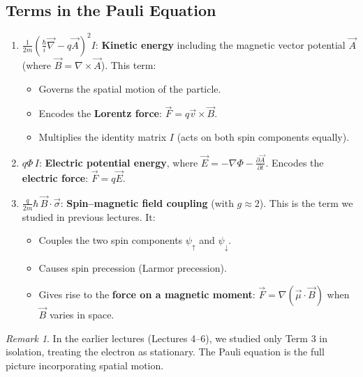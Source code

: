 \documentclass[11pt,a4paper]{article}
\theoremstyle{definition}
\theoremstyle{plain}
\theoremstyle{remark}
\newtheorem{remark}{Remark}[section]
\begin{document}
\subsection{Terms in the Pauli Equation}

\begin{enumerate}[label=\textbf{Term \arabic*:}]
    \item $\displaystyle\frac{1}{2m}\!\left(\frac{\hbar}{i}\vec{\nabla} - q\vec{A}\right)^{\!2}I$: \textbf{Kinetic energy} including the magnetic vector potential $\vec{A}$ (where $\vec{B} = \nabla \times \vec{A}$). This term:
    \begin{itemize}
        \item Governs the spatial motion of the particle.
        \item Encodes the \textbf{Lorentz force}: $\vec{F} = q\vec{v}\times\vec{B}$.
        \item Multiplies the identity matrix $I$ (acts on both spin components equally).
    \end{itemize}

    \item $q\Phi\, I$: \textbf{Electric potential energy}, where $\vec{E} = -\nabla\Phi - \frac{\partial\vec{A}}{\partial t}$. Encodes the \textbf{electric force}: $\vec{F} = q\vec{E}$.

    \item $\displaystyle\frac{q}{2m}\hbar\,\vec{B}\cdot\vec{\sigma}$: \textbf{Spin--magnetic field coupling} (with $g \approx 2$). This is the term we studied in previous lectures. It:
    \begin{itemize}
        \item Couples the two spin components $\psi_\uparrow$ and $\psi_\downarrow$.
        \item Causes spin precession (Larmor precession).
        \item Gives rise to the \textbf{force on a magnetic moment}: $\vec{F} = \nabla(\vec{\mu}\cdot\vec{B})$ when $\vec{B}$ varies in space.
    \end{itemize}
\end{enumerate}

\begin{remark}
    In the earlier lectures (Lectures 4--6), we studied only Term 3 in isolation, treating the electron as stationary. The Pauli equation is the full picture incorporating spatial motion.
\end{remark}

\end{document}
